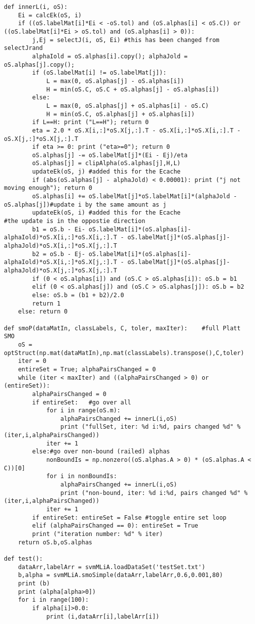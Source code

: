 \begin{lstlisting}
def innerL(i, oS):
    Ei = calcEk(oS, i)
    if ((oS.labelMat[i]*Ei < -oS.tol) and (oS.alphas[i] < oS.C)) or ((oS.labelMat[i]*Ei > oS.tol) and (oS.alphas[i] > 0)):
        j,Ej = selectJ(i, oS, Ei) #this has been changed from selectJrand
        alphaIold = oS.alphas[i].copy(); alphaJold = oS.alphas[j].copy();
        if (oS.labelMat[i] != oS.labelMat[j]):
            L = max(0, oS.alphas[j] - oS.alphas[i])
            H = min(oS.C, oS.C + oS.alphas[j] - oS.alphas[i])
        else:
            L = max(0, oS.alphas[j] + oS.alphas[i] - oS.C)
            H = min(oS.C, oS.alphas[j] + oS.alphas[i])
        if L==H: print ("L==H"); return 0
        eta = 2.0 * oS.X[i,:]*oS.X[j,:].T - oS.X[i,:]*oS.X[i,:].T - oS.X[j,:]*oS.X[j,:].T
        if eta >= 0: print ("eta>=0"); return 0
        oS.alphas[j] -= oS.labelMat[j]*(Ei - Ej)/eta
        oS.alphas[j] = clipAlpha(oS.alphas[j],H,L)
        updateEk(oS, j) #added this for the Ecache
        if (abs(oS.alphas[j] - alphaJold) < 0.00001): print ("j not moving enough"); return 0
        oS.alphas[i] += oS.labelMat[j]*oS.labelMat[i]*(alphaJold - oS.alphas[j])#update i by the same amount as j
        updateEk(oS, i) #added this for the Ecache                    #the update is in the oppostie direction
        b1 = oS.b - Ei- oS.labelMat[i]*(oS.alphas[i]-alphaIold)*oS.X[i,:]*oS.X[i,:].T - oS.labelMat[j]*(oS.alphas[j]-alphaJold)*oS.X[i,:]*oS.X[j,:].T
        b2 = oS.b - Ej- oS.labelMat[i]*(oS.alphas[i]-alphaIold)*oS.X[i,:]*oS.X[j,:].T - oS.labelMat[j]*(oS.alphas[j]-alphaJold)*oS.X[j,:]*oS.X[j,:].T
        if (0 < oS.alphas[i]) and (oS.C > oS.alphas[i]): oS.b = b1
        elif (0 < oS.alphas[j]) and (oS.C > oS.alphas[j]): oS.b = b2
        else: oS.b = (b1 + b2)/2.0
        return 1
    else: return 0

def smoP(dataMatIn, classLabels, C, toler, maxIter):    #full Platt SMO
    oS = optStruct(np.mat(dataMatIn),np.mat(classLabels).transpose(),C,toler)
    iter = 0
    entireSet = True; alphaPairsChanged = 0
    while (iter < maxIter) and ((alphaPairsChanged > 0) or (entireSet)):
        alphaPairsChanged = 0
        if entireSet:   #go over all
            for i in range(oS.m):
                alphaPairsChanged += innerL(i,oS)
                print ("fullSet, iter: %d i:%d, pairs changed %d" % (iter,i,alphaPairsChanged))
            iter += 1
        else:#go over non-bound (railed) alphas
            nonBoundIs = np.nonzero((oS.alphas.A > 0) * (oS.alphas.A < C))[0]
            for i in nonBoundIs:
                alphaPairsChanged += innerL(i,oS)
                print ("non-bound, iter: %d i:%d, pairs changed %d" % (iter,i,alphaPairsChanged))
            iter += 1
        if entireSet: entireSet = False #toggle entire set loop
        elif (alphaPairsChanged == 0): entireSet = True
        print ("iteration number: %d" % iter)
    return oS.b,oS.alphas

def test():
    dataArr,labelArr = svmMLiA.loadDataSet('testSet.txt')
    b,alpha = svmMLiA.smoSimple(dataArr,labelArr,0.6,0.001,80)
    print (b)
    print (alpha[alpha>0])
    for i in range(100):
        if alpha[i]>0.0:
            print (i,dataArr[i],labelArr[i])
\end{lstlisting}

